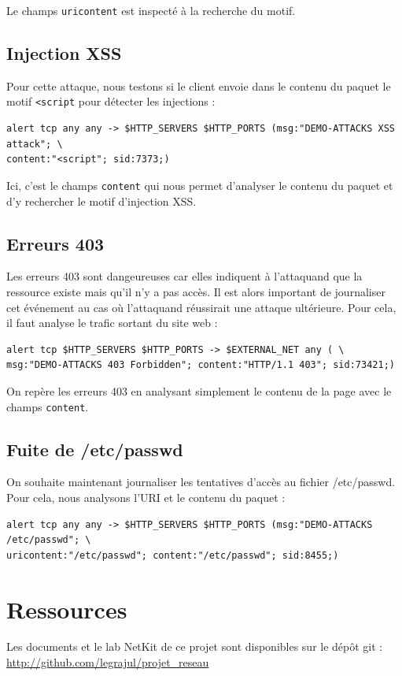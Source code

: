 \documentclass[a4paper,11pt,french]{article}
\begin{document}
Le champs \verb+uricontent+ est inspecté à la recherche du motif.

\subsection{Injection XSS}

Pour cette attaque, nous testons si le client envoie dans le contenu du paquet le motif \verb+<script+ pour détecter les injections :

\begin{Verbatim}
alert tcp any any -> $HTTP_SERVERS $HTTP_PORTS (msg:"DEMO-ATTACKS XSS attack"; \
content:"<script"; sid:7373;)
\end{Verbatim}

Ici, c'est le champs \verb+content+ qui nous permet d'analyser le contenu du paquet et d'y rechercher le motif d'injection XSS.

\subsection{Erreurs 403}

Les erreurs 403 sont dangeureuses car elles indiquent à l'attaquand que la ressource existe mais qu'il n'y a pas accès. Il est alors important de journaliser cet événement au cas où l'attaquand réussirait une attaque ultérieure. Pour cela, il faut analyse le trafic sortant du site web :

\begin{Verbatim}
alert tcp $HTTP_SERVERS $HTTP_PORTS -> $EXTERNAL_NET any ( \
msg:"DEMO-ATTACKS 403 Forbidden"; content:"HTTP/1.1 403"; sid:73421;)
\end{Verbatim}

On repère les erreurs 403 en analysant simplement le contenu de la page avec le champs \verb+content+.

\subsection{Fuite de /etc/passwd}

On souhaite maintenant journaliser les tentatives d'accès au fichier /etc/passwd. Pour cela, nous analysons l'URI et le contenu du paquet :

\begin{Verbatim}
alert tcp any any -> $HTTP_SERVERS $HTTP_PORTS (msg:"DEMO-ATTACKS /etc/passwd"; \
uricontent:"/etc/passwd"; content:"/etc/passwd"; sid:8455;)
\end{Verbatim}

\section{Ressources}

Les documents et le lab NetKit de ce projet sont disponibles sur le dépôt git : \url{http://github.com/legrajul/projet_reseau}
\end{document}
